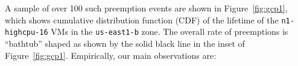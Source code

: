 %
%
A sample of over 100 such preemption events are shown in Figure~\ref{fig:gcp1}, which shows cumulative distribution function (CDF) of the lifetime of the \texttt{n1-highcpu-16} VMs in the \texttt{us-east1-b} zone. 
%
%
The overall rate of preemptions is ``bathtub'' shaped as shown by the solid black line in the inset of Figure~\ref{fig:gcp1}.
Empirically, our main observations are:





